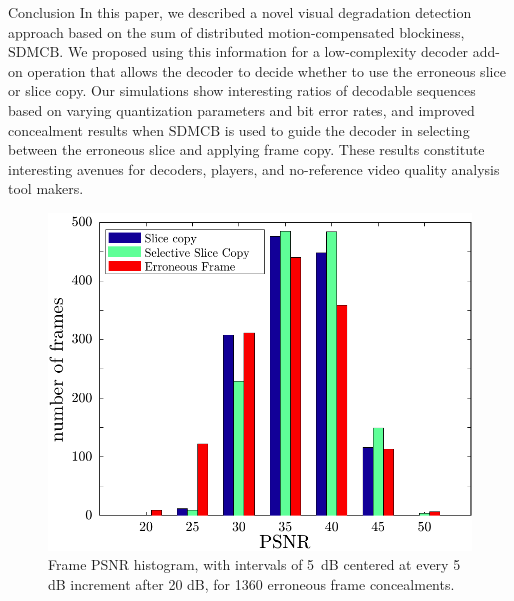 \documentclass{article}
\begin{document}
\vspace{-0.5em}\begin{section}{Conclusion}\vspace{-0.5em}
\label{section-conclusion}
In this paper, we described a novel visual degradation detection approach
based on the sum of distributed motion-compensated blockiness,
$\textrm{SDMCB}$. We proposed using this information for a low-complexity
decoder add-on operation that allows the decoder to decide whether to use
the erroneous slice or slice copy. Our simulations show interesting ratios
of decodable sequences based on varying quantization parameters and bit
error rates, and improved concealment results when $\textrm{SDMCB}$ is used
to guide the decoder in selecting between the erroneous slice and applying
frame copy. These results constitute interesting avenues for decoders,
players, and no-reference video quality analysis tool makers.
\end{section}

\begin{figure}
\centering
\includegraphics[width=1\linewidth]{graphics/FrameDistribution.pdf}\vspace{-1em}
\caption{\small{}Frame PSNR histogram, with intervals of 5~dB centered at every 
5 dB increment after 20 dB, for 1360 erroneous frame concealments.}
\label{fig-FrameDistribution}
\end{figure}

\vspace{-0.75em}
\begin{spacing}{0.85} %


\end{spacing}
\end{document}
